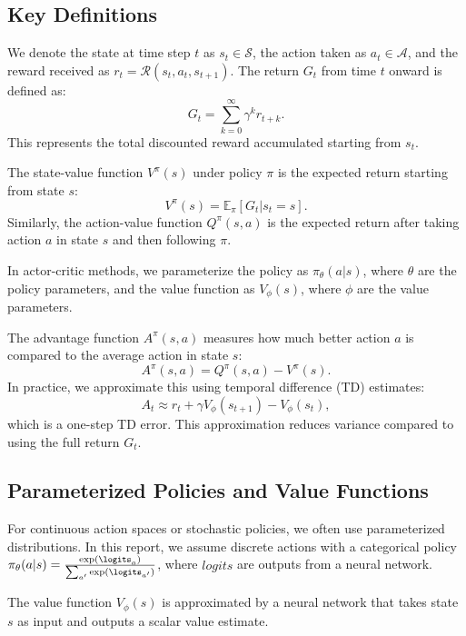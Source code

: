 \documentclass[11pt]{article}
\begin{document}
\subsection{Key Definitions}
We denote the state at time step $t$ as $s_t \in \mathcal{S}$, the action taken as $a_t \in \mathcal{A}$, and the reward received as $r_t = \mathcal{R}(s_t, a_t, s_{t+1})$. The return $G_t$ from time $t$ onward is defined as:
\begin{equation}
G_t = \sum_{k=0}^{\infty} \gamma^k r_{t+k}.
\end{equation}
This represents the total discounted reward accumulated starting from $s_t$.

The state-value function $V^\pi(s)$ under policy $\pi$ is the expected return starting from state $s$:
\begin{equation}
V^\pi(s) = \mathbb{E}_\pi[G_t | s_t = s].
\end{equation}
Similarly, the action-value function $Q^\pi(s,a)$ is the expected return after taking action $a$ in state $s$ and then following $\pi$.

In actor-critic methods, we parameterize the policy as $\pi_\theta(a|s)$, where $\theta$ are the policy parameters, and the value function as $V_\phi(s)$, where $\phi$ are the value parameters.

The advantage function $A^\pi(s,a)$ measures how much better action $a$ is compared to the average action in state $s$:
\begin{equation}
A^\pi(s,a) = Q^\pi(s,a) - V^\pi(s).
\end{equation}
In practice, we approximate this using temporal difference (TD) estimates:
\begin{equation}
A_t \approx r_t + \gamma V_\phi(s_{t+1}) - V_\phi(s_t),
\end{equation}
which is a one-step TD error. This approximation reduces variance compared to using the full return $G_t$.

\subsection{Parameterized Policies and Value Functions}
For continuous action spaces or stochastic policies, we often use parameterized distributions. In this report, we assume discrete actions with a categorical policy $\pi_\theta(a|s) = \frac{\exp(\logits_a)}{\sum_{a'} \exp(\logits_{a'})}$, where $logits$ are outputs from a neural network.

The value function $V_\phi(s)$ is approximated by a neural network that takes state $s$ as input and outputs a scalar value estimate.
\end{document}
